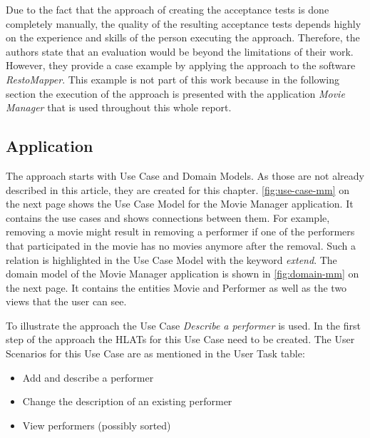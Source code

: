 Due to the fact that the approach of creating the acceptance tests is done completely manually, the quality of the resulting acceptance tests depends highly on the experience and skills of the person executing the approach.
Therefore, the authors state that an evaluation would be beyond the limitations of their work.
However, they provide a case example by applying the approach to the software \textit{RestoMapper}.
This example is not part of this work because in the following section the execution of the approach is presented with the application \textit{Movie Manager} that is used throughout this whole report.

\subsection{Application}

The approach starts with Use Case and Domain Models.
As those are not already described in this article, they are created for this chapter.
\autoref{fig:use-case-mm} on the next page shows the Use Case Model for the Movie Manager application.
It contains the use cases and shows connections between them.
For example, removing a movie might result in removing a performer if one of the performers that participated in the movie has no movies anymore after the removal.
Such a relation is highlighted in the Use Case Model with the keyword \textit{extend}.
The domain model of the Movie Manager application is shown in \autoref{fig:domain-mm} on the next page.
It contains the entities Movie and Performer as well as the two views that the user can see.

To illustrate the approach the Use Case \textit{Describe a performer} is used.
In the first step of the approach the HLATs for this Use Case need to be created.
The User Scenarios for this Use Case are as mentioned in the User Task table:
\begin{itemize}
	\item Add and describe a performer
	\item Change the description of an existing performer
	\item View performers (possibly sorted)
\end{itemize}

